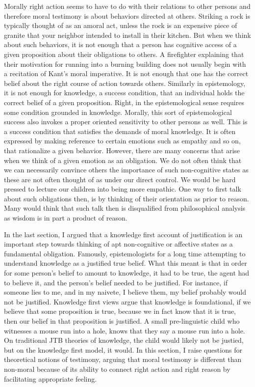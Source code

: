 \documentclass[
  12pt,
]{book}
\theoremstyle{definition}
\theoremstyle{definition}
\theoremstyle{definition}
\theoremstyle{definition}
\theoremstyle{remark}
\begin{document}
Morally right action seems to have to do with their relations to other persons and therefore moral testimony is about behaviors directed at others. Striking a rock is typically thought of as an amoral act, unless the rock is an expensive piece of granite that your neighbor intended to install in their kitchen. But when we think about such behaviors, it is not enough that a person has cognitive access of a given proposition about their obligations to others. A firefighter explaining that their motivation for running into a burning building does not usually begin with a recitation of Kant's moral imperative. It is not enough that one has the correct belief about the right course of action towards others. Similarly in epistemology, it is not enough for knowledge, a success condition, that an individual holds the correct belief of a given proposition. Right, in the epistemological sense requires some condition grounded in knowledge. Morally, this sort of epistemological success also invokes a proper oriented sensitivity to other persons as well. This is a success condition that satisfies the demands of moral knowledge. It is often expressed by making reference to certain emotions such as empathy and so on, that rationalize a given behavior. However, there are many concerns that arise when we think of a given emotion as an obligation. We do not often think that we can necessarily convince others the importance of such non-cognitive states as these are not often thought of as under our direct control. We would be hard pressed to lecture our children into being more empathic. One way to first talk about such obligations then, is by thinking of their orientation as prior to reason. Many would think that such talk then is disqualified from philosophical analysis as wisdom is in part a product of reason.

In the last section, I argued that a knowledge first account of justification is an important step towards thinking of apt non-cognitive or affective states as a fundamental obligation. Famously, epistemologists for a long time attempting to understand knowledge as a justified true belief. What this meant is that in order for some person's belief to amount to knowledge, it had to be true, the agent had to believe it, and the person's belief needed to be justified. For instance, if someone lies to me, and in my naivete, I believe them, my belief probably would not be justified. Knowledge first views argue that knowledge is foundational, if we believe that some proposition is true, because we in fact know that it is true, then our belief in that proposition is justified. A small pre-linguistic child who witnesses a mouse run into a hole, knows that they say a mouse run into a hole. On traditional JTB theories of knowledge, the child would likely not be justied, but on the knowledge first model, it would. In this section, I raise questions for theoretical notions of testimony, arguing that moral testimony is different than non-moral because of its ability to connect right action and right reason by facilitating appropriate feeling.
\end{document}
